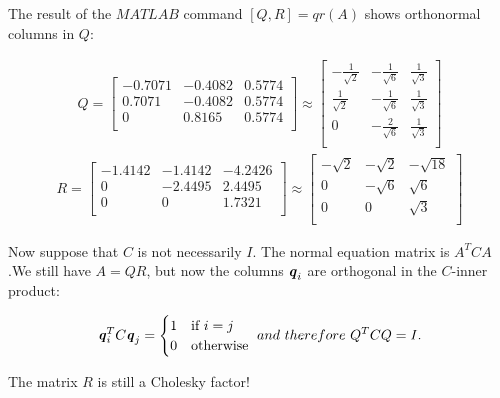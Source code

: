 \begin{flushleft}
	The result of the $MATLAB$ command $[Q,R]=qr(A)$ shows orthonormal columns in $Q$:
\end{flushleft}
\begin{align*}
Q=
\begin{bmatrix}
-0.7071&-0.4082&0.5774 \\	
0.7071 &-0.4082&0.5774 \\		
0      &0.8165 &0.5774 \\	
\end{bmatrix}
\approx
\begin{bmatrix}
-\frac{1}{\sqrt{2}}&-\frac{1}{\sqrt{6}}& \frac{1}{\sqrt{3}} \\	
 \frac{1}{\sqrt{2}}&-\frac{1}{\sqrt{6}}& \frac{1}{\sqrt{3}} \\		
         0         &-\frac{2}{\sqrt{6}}& \frac{1}{\sqrt{3}} \\	
\end{bmatrix}
\end{align*}
\begin{align*}
R=
\begin{bmatrix}
-1.4142&-1.4142&-4.2426 \\	
0      &-2.4495& 2.4495 \\		
0      &0      & 1.7321 \\	
\end{bmatrix}
\approx
\begin{bmatrix}
-\sqrt{2}&-\sqrt{2}&-\sqrt{18} \\	
0        &-\sqrt{6}& \sqrt{6 } \\		
0        &0        & \sqrt{3} \\	
\end{bmatrix}
\end{align*}

Now suppose that $C$ is not necessarily $I$. The normal equation matrix is $A^{T}CA$.We still have $A=QR$, but now the columns $\textbf{\textit{q}}_{i}$ are orthogonal in the $C$-inner product:

$$
\textbf{\textit{q}}^{T}_{i}C\textbf{\textit{q}}_{j}=
\begin{cases}
1& \text{if}\ i=j\\
0& \text{otherwise}
\end{cases} \ 
and \ therefore \  Q^{T}CQ=I.
$$

\begin{flushleft}
	The matrix $R$ is still a Cholesky factor!
\end{flushleft}

